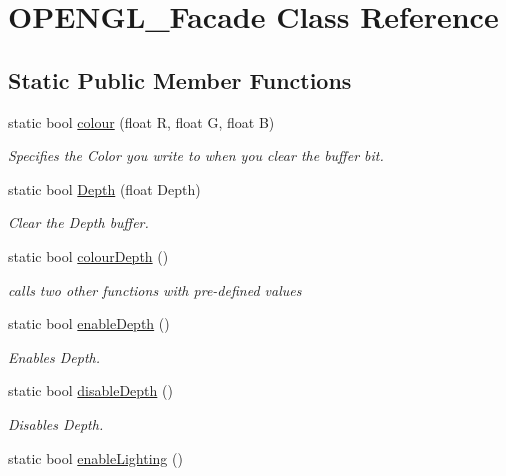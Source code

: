 \hypertarget{class_o_p_e_n_g_l___facade}{\section{O\-P\-E\-N\-G\-L\-\_\-\-Facade Class Reference}
\label{class_o_p_e_n_g_l___facade}
}
\subsection*{Static Public Member Functions}
\begin{DoxyCompactItemize}
\item 
static bool \hyperlink{class_o_p_e_n_g_l___facade_ae0412d4df1d7ff1120503166033779ef}{colour} (float R, float G, float B)
\begin{DoxyCompactList}\small\item\em Specifies the Color you write to when you clear the buffer bit. \end{DoxyCompactList}\item 
static bool \hyperlink{class_o_p_e_n_g_l___facade_ad037c614275d05f2a532752e93b390aa}{Depth} (float Depth)
\begin{DoxyCompactList}\small\item\em Clear the Depth buffer. \end{DoxyCompactList}\item 
static bool \hyperlink{class_o_p_e_n_g_l___facade_abe5c7d40eefccfcfa32323bb91c7adc3}{colour\-Depth} ()
\begin{DoxyCompactList}\small\item\em calls two other functions with pre-\/defined values \end{DoxyCompactList}\item 
static bool \hyperlink{class_o_p_e_n_g_l___facade_a908faa52f01d8a827265979cbc4d4da7}{enable\-Depth} ()
\begin{DoxyCompactList}\small\item\em Enables Depth. \end{DoxyCompactList}\item 
static bool \hyperlink{class_o_p_e_n_g_l___facade_a61c708109c77441e1a12d1dd5e4dd2ec}{disable\-Depth} ()
\begin{DoxyCompactList}\small\item\em Disables Depth. \end{DoxyCompactList}\item 
static bool \hyperlink{class_o_p_e_n_g_l___facade_ab7a5aada5aad4a2a18739b6fb04782b7}{enable\-Lighting} ()

\end{DoxyCompactItemize}
